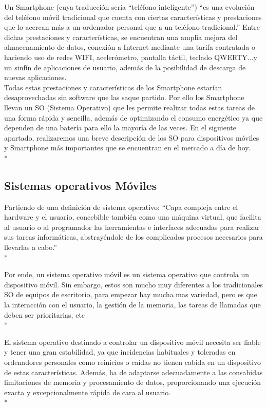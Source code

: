 \documentclass[../pfc.tex]{subfiles}
\begin{document}
	Un Smartphone (cuya traducción sería “teléfono inteligente”) “es una evolución del teléfono móvil tradicional que cuenta con ciertas características y prestaciones que lo acercan más a un ordenador personal que a un teléfono tradicional.”
	Entre dichas prestaciones y características, se encuentran una amplia mejora del almacenamiento de datos, conexión a Internet mediante una tarifa contratada o haciendo uso de redes WIFI, acelerómetro, pantalla táctil, teclado QWERTY...y un sinfín de aplicaciones de usuario, además de la posibilidad de descarga de nuevas aplicaciones.\\
	Todas estas prestaciones y características de los Smartphone estarían desaprovechadas sin software que las saque partido. Por ello los Smartphone llevan un SO (Sistema Operativo) que les permite realizar todas estas tareas de una forma rápida y sencilla, además de optimizando el consumo energético ya que dependen de una batería para ello la mayoría de las veces. 
	En el siguiente apartado, realizaremos una breve descripción de los SO para dispositivos móviles y Smartphone más importantes que se encuentran en el mercado a día de hoy.\\*
	
	\subsection{Sistemas operativos Móviles}
	Partiendo de una definición de sistema operativo: “Capa compleja entre el hardware y el usuario, concebible también como una máquina virtual, que facilita al usuario o al programador las herramientas e interfaces adecuadas para realizar sus tareas informáticas, abstrayéndole de los complicados procesos necesarios para llevarlas a cabo.”\\*
	
	Por ende, un sistema operativo móvil es un sistema operativo que controla un dispositivo móvil. Sin embargo, estos son mucho muy diferentes a los tradicionales SO de equipos de escritorio, para empezar hay mucha mas variedad, pero es que la interacción con el usuario, la gestión de la memoria, las tareas de llamadas que deben ser prioritarias, etc\\*
	
	El sistema operativo destinado a controlar un dispositivo móvil necesita ser fiable y tener una gran estabilidad, ya que incidencias habituales y toleradas en ordenadores personales como reinicios o caídas no tienen cabida en un dispositivo de estas características. Además, ha de adaptarse adecuadamente a las consabidas limitaciones de memoria y procesamiento de datos, proporcionando una ejecución exacta y excepcionalmente rápida de cara al usuario.\\*
	
\end{document}
